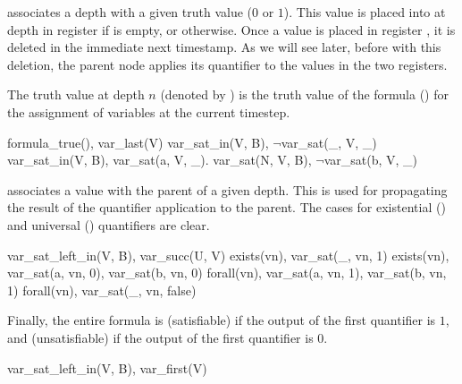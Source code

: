  associates a depth with a given truth value ($0$ or $1$).  This value is placed into  at depth  in register  if  is empty, or  otherwise.  Once a value is placed in register , it is deleted in the immediate next timestamp.  As we will see later, before with this deletion, the parent node applies its quantifier to the values in the two registers.

The truth value at depth $n$ (denoted by ) is the truth value of the formula () for the assignment of variables at the current timestep.

\begin{Drules}
        {formula_true(), var_last(V)}
        {var_sat_in(V, B), $\lnot$var_sat(_, V, _)}
        {var_sat_in(V, B), var_sat(a, V, _).}
        {var_sat(N, V, B), $\lnot$var_sat(b, V, _)}
\end{Drules}

 associates a value with the parent of a given depth.  This is used for propagating the result of the quantifier application to the parent.  The cases for existential () and universal () quantifiers are clear.

\begin{Drules}
        {var_sat_left_in(V, B), var_succ(U, V)}
        {exists(vn), var_sat(_, vn, 1)}
        {exists(vn), var_sat(a, vn, 0), var_sat(b, vn, 0)}
        {forall(vn), var_sat(a, vn, 1), var_sat(b, vn, 1)}
  {forall(vn), var_sat(_, vn, false)}
\end{Drules}

Finally, the entire formula is  (satisfiable) if the output of the first quantifier is $1$, and  (unsatisfiable) if the output of the first quantifier is $0$.

\begin{Drules}
        {var_sat_left_in(V, B), var_first(V)}
\end{Drules}

